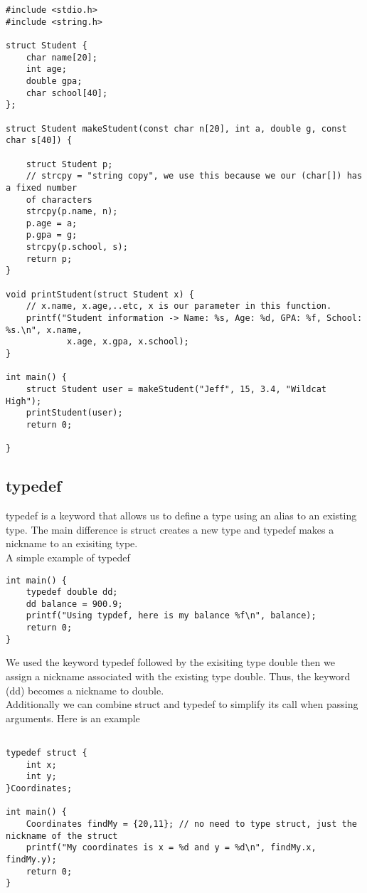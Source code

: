 \documentclass{article}
\begin{document}
\begin{verbatim}
#include <stdio.h>
#include <string.h>

struct Student {
	char name[20];
	int age;
	double gpa;
	char school[40];
};

struct Student makeStudent(const char n[20], int a, double g, const char s[40]) {

	struct Student p;
	// strcpy = "string copy", we use this because we our (char[]) has a fixed number 
	of characters
	strcpy(p.name, n);
	p.age = a;
	p.gpa = g;
	strcpy(p.school, s);
	return p;
}

void printStudent(struct Student x) {
	// x.name, x.age,..etc, x is our parameter in this function.
	printf("Student information -> Name: %s, Age: %d, GPA: %f, School: %s.\n", x.name, 
			x.age, x.gpa, x.school);
}

int main() {
	struct Student user = makeStudent("Jeff", 15, 3.4, "Wildcat High");
	printStudent(user);
	return 0;

}
\end{verbatim}

\subsection*{typedef}
typedef is a keyword that allows us to define a type using an alias to an existing type. The main difference is struct creates a new type and typedef
makes a nickname to an exisiting type. \\

\noindent A simple example of typedef

\begin{verbatim}
int main() {
	typedef double dd;
	dd balance = 900.9;
	printf("Using typdef, here is my balance %f\n", balance);
	return 0;
}
\end{verbatim}

We used the keyword typedef followed by the exisiting type double then we assign a nickname associated 
with the existing type double. Thus, the keyword (dd) becomes a nickname to double. \\

\noindent Additionally we can combine struct and typedef to simplify its call when passing arguments. 
Here is an example

\begin{verbatim}

typedef struct {
	int x;
	int y;
}Coordinates;

int main() {
	Coordinates findMy = {20,11}; // no need to type struct, just the nickname of the struct
	printf("My coordinates is x = %d and y = %d\n", findMy.x, findMy.y);
	return 0;
}
\end{verbatim}
\end{document}
